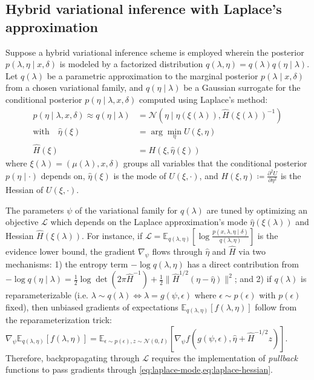 \documentclass{article}
\begin{document}
\subsection{Hybrid variational inference with Laplace's approximation}

Suppose a hybrid variational inference scheme is employed wherein the posterior $p(\lambda, \eta \mid x, \delta)$ is modeled by a factorized distribution $q(\lambda, \eta) = q(\lambda) q(\eta \mid \lambda)$.
Let $q(\lambda)$ be a parametric approximation to the marginal posterior $p(\lambda \mid x, \delta)$ from a chosen variational family, and $q(\eta \mid \lambda)$ be a Gaussian surrogate for the conditional posterior $p(\eta \mid \lambda, x, \delta)$ computed using Laplace's method:
%
\begin{align}
  p(\eta \mid \lambda, x, \delta) \approx q(\eta \mid \lambda) & = \mathcal{N}(\eta \mid \hat{\eta}(\xi(\lambda)), \hat{H}(\xi(\lambda))^{-1}) \\
  \text{with} \quad
  \hat{\eta}(\xi)                                              & = \arg\min_{\eta} U(\xi, \eta) \label{eq:laplace-mode}                        \\
  \hat{H}(\xi)                                                 & = H(\xi, \hat{\eta}(\xi)) \label{eq:laplace-hessian}
\end{align}
%
where $\xi(\lambda) = (\mu(\lambda), x, \delta)$ groups all variables that the conditional posterior $p(\eta \mid \cdot)$ depends on, $\hat{\eta}(\xi)$ is the mode of $U(\xi, \cdot)$, and $H(\xi, \eta) \coloneqq \frac{\partial^2 U}{\partial \eta^2}$ is the Hessian of $U(\xi, \cdot)$.

The parameters $\psi$ of the variational family for $q(\lambda)$ are tuned by optimizing an objective $\mathcal{L}$ which depends on the Laplace approximation's mode $\hat{\eta}(\xi(\lambda))$ and Hessian $\hat{H}(\xi(\lambda))$.
For instance, if $\mathcal{L} = \mathbb{E}_{q(\lambda, \eta)} \left[\log \frac{p(x, \lambda, \eta \mid \delta)}{q(\lambda, \eta)}\right]$ is the evidence lower bound, the gradient $\nabla_\psi$ flows through $\hat{\eta}$ and $\hat{H}$ via two mechanisms:
1) the entropy term $-\log q(\lambda, \eta)$ has a direct contribution from $-\log q(\eta \mid \lambda) = \tfrac{1}{2}\log\det(2\pi\hat{H}^{-1}) + \tfrac{1}{2} \lVert \hat{H}^{1/2} (\eta - \hat{\eta}) \rVert^2$;
and 2) if $q(\lambda)$ is reparameterizable (i.e. $\lambda \sim q(\lambda) \Leftrightarrow \lambda = g(\psi, \epsilon)$ where $\epsilon \sim p(\epsilon)$ with $p(\epsilon)$ fixed), then unbiased gradients of expectations $\mathbb{E}_{q(\lambda, \eta)}[f(\lambda, \eta)]$ follow from the reparameterization trick:
$\nabla_\psi \mathbb{E}_{q(\lambda, \eta)}[f(\lambda, \eta)] = \mathbb{E}_{\epsilon \sim p(\epsilon), z \sim \mathcal{N}(0, I)}[\nabla_\psi f(g(\psi, \epsilon), \hat{\eta} + \hat{H}^{-1/2} z)]$.
Therefore, backpropagating through $\mathcal{L}$ requires the implementation of \textit{pullback} functions to pass gradients through \cref{eq:laplace-mode,eq:laplace-hessian}.
\end{document}

